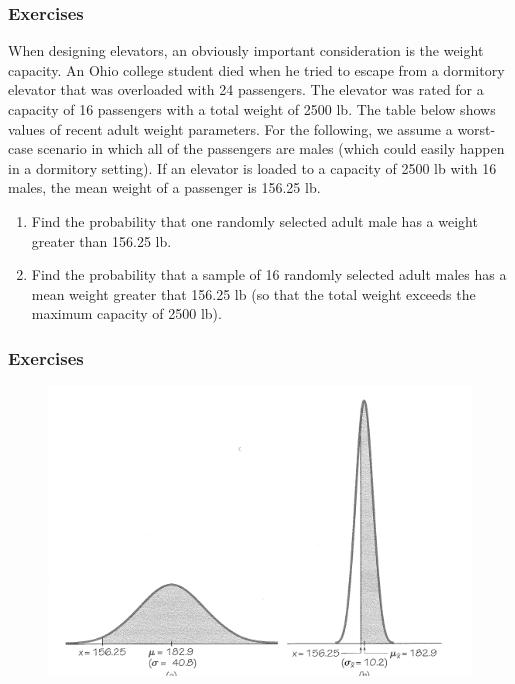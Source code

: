 \documentclass[xcolor=dvipsnames]{beamer}
\begin{document}
\begin{frame}
  \frametitle{Exercises} 
  {\ubung} When designing elevators, an obviously important
  consideration is the weight capacity. An Ohio college student died
  when he tried to escape from a dormitory elevator that was
  overloaded with 24 passengers. The elevator was rated for a capacity
  of 16 passengers with a total weight of 2500 lb. The table below
  shows values of recent adult weight parameters. For the following,
  we assume a worst-case scenario in which all of the passengers are
  males (which could easily happen in a dormitory setting). If an
  elevator is loaded to a capacity of 2500 lb with 16 males, the mean
  weight of a passenger is 156.25 lb.
  \begin{enumerate}
  \item<1-> Find the probability that one randomly selected adult male
    has a weight greater than 156.25 lb.
  \item<2-> Find the probability that a sample of 16 randomly selected
    adult males has a mean weight greater that 156.25 lb (so that the
    total weight exceeds the maximum capacity of 2500 lb).
  \end{enumerate}
\end{frame}

\begin{frame}
  \frametitle{Exercises} 
\begin{figure}[h]
\includegraphics[scale=.75]{./diagrams/triola-281.png}
\end{figure}
\end{frame}
\end{document}
